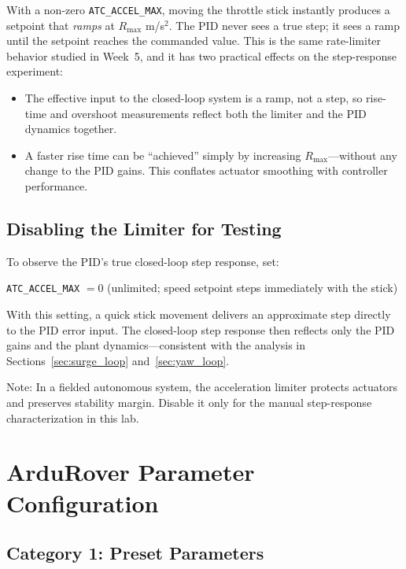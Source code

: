 \documentclass[../../book.tex]{subfiles}
\begin{document}
With a non-zero \texttt{ATC\_ACCEL\_MAX}, moving the throttle stick instantly produces a setpoint that \emph{ramps} at $R_{\max}$ m/s$^2$.  The PID never sees a true step; it sees a ramp until the setpoint reaches the commanded value.  This is the same rate-limiter behavior studied in Week~5, and it has two practical effects on the step-response experiment:

\begin{itemize}
  \item The effective input to the closed-loop system is a ramp, not a step, so rise-time and overshoot measurements reflect both the limiter and the PID dynamics together.
  \item A faster rise time can be ``achieved'' simply by increasing $R_{\max}$---without any change to the PID gains.  This conflates actuator smoothing with controller performance.
\end{itemize}

\subsection{Disabling the Limiter for Testing}

To observe the PID's true closed-loop step response, set:

\begin{center}
  \texttt{ATC\_ACCEL\_MAX} $= 0$ \quad (unlimited; speed setpoint steps immediately with the stick)
\end{center}

With this setting, a quick stick movement delivers an approximate step directly to the PID error input.  The closed-loop step response then reflects only the PID gains and the plant dynamics---consistent with the analysis in Sections~\ref{sec:surge_loop} and~\ref{sec:yaw_loop}.

Note: In a fielded autonomous system, the acceleration limiter protects actuators and preserves stability margin.  Disable it only for the manual step-response characterization in this lab.

\section{ArduRover Parameter Configuration}
\label{sec:params}

\subsection{Category 1: Preset Parameters}
\end{document}

